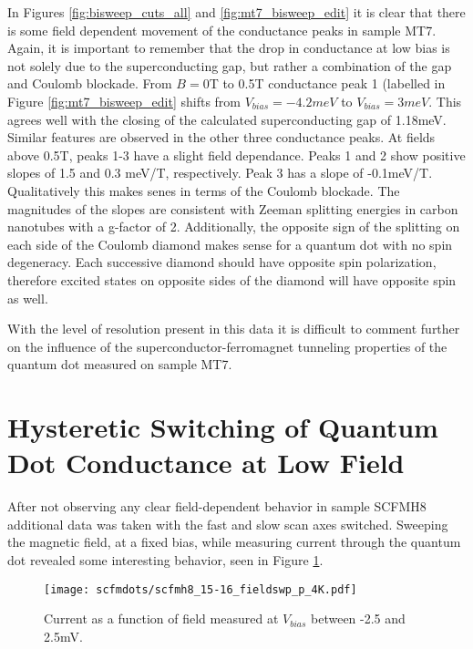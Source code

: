 In Figures \ref{fig:bisweep_cuts_all} and \ref{fig:mt7_bisweep_edit} it is clear that there is some field dependent movement of the conductance peaks in sample MT7. Again, it is important to remember that the drop in conductance at low bias is not solely due to the superconducting gap, but rather a combination of the gap and Coulomb blockade. From $B=0$T to 0.5T conductance peak 1 (labelled in Figure \ref{fig:mt7_bisweep_edit} shifts from $V_{bias}=-4.2meV$ to $V_{bias}=3meV$. This agrees well with the closing of the calculated superconducting gap of 1.18meV. Similar features are observed in the other three conductance peaks. At fields above 0.5T, peaks 1-3 have a slight field dependance. Peaks 1 and 2 show positive slopes of 1.5 and 0.3 meV/T, respectively. Peak 3 has a slope of -0.1meV/T. Qualitatively this makes senes in terms of the Coulomb blockade. The magnitudes of the slopes are consistent with Zeeman splitting energies in carbon nanotubes with a g-factor of 2. Additionally, the opposite sign of the splitting on each side of the Coulomb diamond makes sense for a quantum dot with no spin degeneracy. Each successive diamond should have opposite spin polarization, therefore excited states on opposite sides of the diamond will have opposite spin as well. 

With the level of resolution present in this data it is difficult to comment further on the influence of the superconductor-ferromagnet tunneling properties of the quantum dot measured on sample MT7.

\section{Hysteretic Switching of Quantum Dot Conductance at Low Field}
\label{sec:scfm_switching}

After not observing any clear field-dependent behavior in sample SCFMH8 additional data was taken with the fast and slow scan axes switched. Sweeping the magnetic field, at a fixed bias, while measuring current through the quantum dot revealed some interesting behavior, seen in Figure \ref{fig:scfmh8_positive_field_switching}.

\begin{figure}
    \centering
    \texttt{[image: scfmdots/scfmh8\_15-16\_fieldswp\_p\_4K.pdf]}
    \caption{Current as a function of field measured at $V_{bias}$ between -2.5 and 2.5mV. }
    \label{fig:scfmh8_positive_field_switching}
\end{figure}

